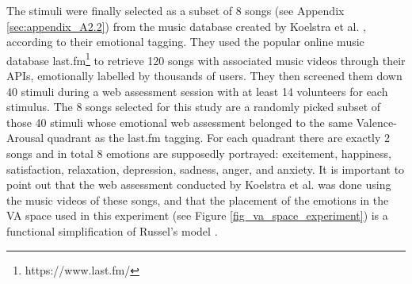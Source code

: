The stimuli were finally selected as a subset of 8 songs (see Appendix \ref{sec:appendix_A2.2}) from the music database created by Koelstra et al. \cite{koelstra_deap_2012}, according to their emotional tagging. They used the popular online music database last.fm\footnote{https://www.last.fm/}  to retrieve 120 songs with associated music videos through their APIs, emotionally labelled by thousands of users. They then screened them down 40 stimuli during a web assessment session with at least 14 volunteers for each stimulus. The 8 songs selected for this study are a randomly picked subset of those 40 stimuli whose emotional web assessment belonged to the same Valence-Arousal quadrant as the last.fm tagging. For each quadrant there are exactly 2 songs and in total 8 emotions are supposedly portrayed: excitement, happiness, satisfaction, relaxation, depression, sadness, anger, and anxiety. 
It is important to point out that the web assessment conducted by Koelstra et al. was done using the music videos of these songs, and that the placement of the emotions in the \ac{VA} space used in this experiment (see Figure \ref{fig_va_space_experiment}) is a functional simplification of Russel's model \cite{russell_circumplex_1980}.

